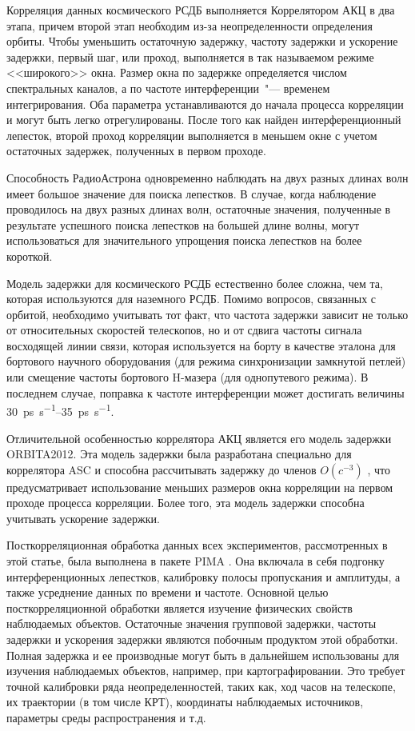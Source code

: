 Корреляция данных космического РСДБ выполняется Коррелятором АКЦ в два этапа, причем второй этап
необходим из-за неопределенности определения орбиты. Чтобы уменьшить остаточную задержку, частоту
задержки и ускорение задержки, первый шаг, или проход, выполняется в так называемом режиме
<<широкого>> окна. Размер окна по задержке определяется числом спектральных каналов, а по частоте
интерференции~"--- временем интегрирования. Оба параметра устанавливаются до начала процесса
корреляции и могут быть легко отрегулированы. После того как найден интерференционный лепесток,
второй проход корреляции выполняется в меньшем окне с учетом остаточных задержек, полученных в
первом проходе.

Способность РадиоАстрона одновременно наблюдать на двух разных длинах волн имеет большое значение
для поиска лепестков. В случае, когда наблюдение проводилось на двух разных длинах волн, остаточные
значения, полученные в результате успешного поиска лепестков на большей длине волны, могут
использоваться для значительного упрощения поиска лепестков на более короткой.

Модель задержки для космического РСДБ естественно более сложна, чем та, которая используются для
наземного РСДБ. Помимо вопросов, связанных с орбитой, необходимо учитывать тот факт, что частота
задержки зависит не только от относительных скоростей телескопов, но и от сдвига частоты сигнала
восходящей линии связи, которая используется на борту в качестве эталона для бортового научного
оборудования (для режима синхронизации замкнутой петлей) или смещение частоты
бортового H-мазера (для однопутевого режима). В последнем случае, поправка к частоте интерференции
может достигать величины \SIrange{30}{35}{\pico\second\per\second}.

Отличительной особенностью коррелятора АКЦ является его модель задержки ORBITA2012. Эта модель
задержки была разработана специально для коррелятора ASC и способна рассчитывать задержку до членов
$O(c^{-3})$ \cite{Vlasov_2012}, что предусматривает использование меньших размеров окна корреляции
на первом проходе процесса корреляции. Более того, эта модель задержки способна учитывать ускорение
задержки.

Посткорреляционная обработка данных всех экспериментов, рассмотренных в этой статье, была
выполнена в пакете PIMA \cite{Petrov_2011}. Она включала в себя подгонку интерференционных
лепестков, калибровку полосы пропускания и амплитуды, а также усреднение данных по времени и
частоте. Основной целью посткорреляционной обработки является изучение физических свойств
наблюдаемых объектов. Остаточные значения групповой задержки, частоты задержки и ускорения задержки
являются побочным продуктом этой обработки. Полная задержка и ее производные могут быть
в дальнейшем использованы для изучения наблюдаемых объектов, например, при картографировании.
Это требует точной калибровки ряда неопределенностей, таких как, ход часов на телескопе, их
траектории (в том числе КРТ), координаты наблюдаемых источников, параметры среды распространения и
т.д.

